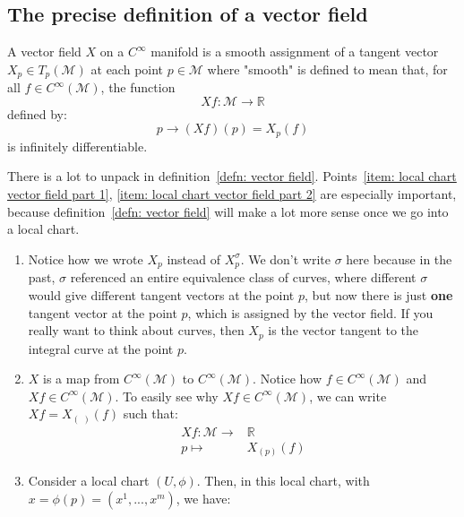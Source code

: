   \subsection*{The precise definition of a vector field}
    \begin{definition}
      \label{defn: vector field}
      A vector field $X$ on a $C^\infty$ manifold is a smooth assignment of a
      tangent vector $X_p \in T_p(\mathcal{M})$ at each point
      $p\in\mathcal{M}$ where "smooth" is defined to mean that, for all $f\in
      C^\infty(\mathcal{M})$, the function \[Xf: \mathcal{M} \rightarrow \mathbb{R}\]
      defined by:
      \[p \rightarrow (Xf)(p) = X_p(f)\]
      is infinitely differentiable.
    \end{definition}
    \begin{remark}
      There is a lot to unpack in definition~\ref{defn: vector field}.
      Points~\ref{item: local chart vector field part 1}, \ref{item: local
      chart vector field part 2} are especially important, because
      definition~\ref{defn: vector field} will make a lot more sense once we
      go into a local chart.
      \begin{enumerate}
        \item{Notice how we wrote $X_p$ instead of $X^\sigma_p$. We don't
        write $\sigma$ here because in the past, $\sigma$ referenced an
        entire equivalence class of curves, where different $\sigma$ would
        give different tangent vectors at the point $p$, but now there is
        just \textbf{one} tangent vector at the point $p$, which is assigned
        by the vector field. If you really want to think about curves, then
        $X_p$ is the vector tangent to the integral curve at the point $p$.}
        \item{$X$ is a map from $C^\infty(\mathcal{M})$ to
          $C^\infty(\mathcal{M})$. Notice how $f \in C^\infty(\mathcal{M})$
          and $Xf \in C^\infty(\mathcal{M})$. To easily see why $Xf \in
          C^\infty(\mathcal{M})$,
          we can write $Xf = X_{(\,\,)}(f)$ such that:
          \begin{align*}
            Xf: \mathcal{M} \rightarrow& \mathbb{R}\\
            p \mapsto& X_{(p)}(f)
          \end{align*}}
        \item{\label{item: local chart vector field part 1}Consider a local chart
        $(U,\phi)$. Then, in this local chart, with $x = \phi(p) = (x^1,...,x^m)$, we have:
}
\end{enumerate}
\end{remark}
